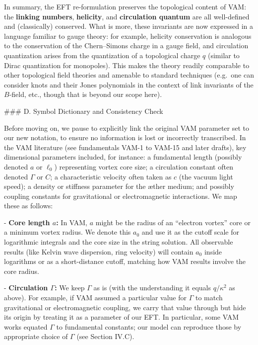 \documentclass[12pt]{article}
\begin{document}
In summary, the EFT re-formulation preserves the topological content of VAM: the \textbf{linking numbers}, \textbf{helicity}, and \textbf{circulation quantum} are all well-defined and (classically) conserved. What is more, these invariants are now expressed in a language familiar to gauge theory: for example, helicity conservation is analogous to the conservation of the Chern--Simons charge in a gauge field, and circulation quantization arises from the quantization of a topological charge $q$ (similar to Dirac quantization for monopoles). This makes the theory readily comparable to other topological field theories and amenable to standard techniques (e.g.\ one can consider knots and their Jones polynomials in the context of link invariants of the $B$-field, etc., though that is beyond our scope here).

### D. Symbol Dictionary and Consistency Check

Before moving on, we pause to explicitly link the original VAM parameter set to our new notation, to ensure no information is lost or incorrectly transcribed. In the VAM literature (see fundamentals VAM-1 to VAM-15 and later drafts), key dimensional parameters included, for instance: a fundamental length (possibly denoted $a$ or $\ell_0$) representing vortex core size; a circulation constant often denoted $\Gamma$ or $C$; a characteristic velocity often taken as $c$ (the vacuum light speed); a density or stiffness parameter for the æther medium; and possibly coupling constants for gravitational or electromagnetic interactions. We map these as follows: 

- \textbf{Core length $a$:} In VAM, $a$ might be the radius of an “electron vortex” core or a minimum vortex radius. We denote this $a_0$ and use it as the cutoff scale for logarithmic integrals and the core size in the string solution. All observable results (like Kelvin wave dispersion, ring velocity) will contain $a_0$ inside logarithms or as a short-distance cutoff, matching how VAM results involve the core radius.

- \textbf{Circulation $\Gamma$:} We keep $\Gamma$ as is (with the understanding it equals $q/\kappa^2$ as above). For example, if VAM assumed a particular value for $\Gamma$ to match gravitational or electromagnetic coupling, we carry that value through but hide its origin by treating it as a parameter of our EFT. In particular, some VAM works equated $\Gamma$ to fundamental constants; our model can reproduce those by appropriate choice of $\Gamma$ (see Section IV.C).
\end{document}
